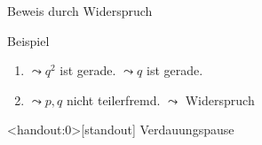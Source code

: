 \begin{frame}[fragile]{Beweis durch Widerspruch}
{\begin{exampleblock}{Beispiel}
\begin{enumerate}
            \item<9-|handout:2> $\leadsto q^2$ ist gerade. \alert<10>{$\leadsto q$ ist gerade.}
            \item<10-|handout:2> \alert<10>{$\leadsto p,q$ nicht teilerfremd.} \alert<11>{$\leadsto$ Widerspruch}
        \end{enumerate}
    \end{exampleblock}
}
\end{frame}

\begin{frame}<handout:0>[standout]
    Verdauungspause
\end{frame}
